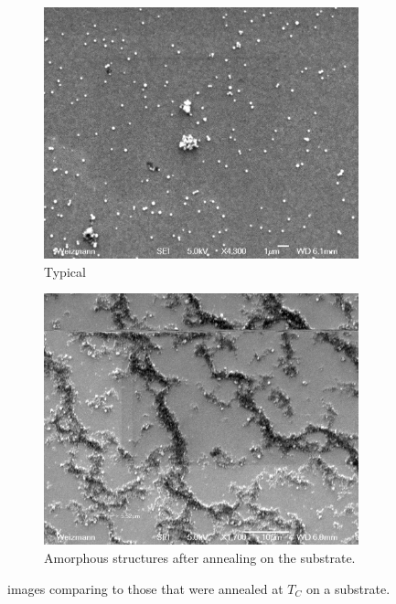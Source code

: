 \begin{figure}
\begin{subfigure}{1\textwidth}
\centering
	\includegraphics[width=0.9\linewidth]{./figs/chap1/semTYPNANO}
	\caption{Typical \pvdf{} \nps}
	\label{fig:semtypnano}
\end{subfigure}
\vspace{30pt}
\begin{subfigure}{1\textwidth}
\centering
	\includegraphics[width=0.9\linewidth]{./figs/chap1/semNANOSOUP}
	\caption{Amorphous structures after annealing on the substrate.}
	\label{fig:semnanosoup}
\end{subfigure}
\caption{\sem{} images comparing  \pvdf{} \nps{} to those that were annealed at $T_C$ on a substrate.}
\label{fig:semnps}
\end{figure}

